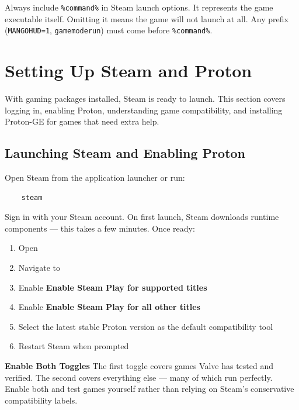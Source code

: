 \documentclass{article}
\newcommand{\code}[1]{\colorbox{codebg}{\texttt{#1}}}
\begin{document}
\begin{tcolorbox}[arc=12pt, outer arc=10pt,
	colback=red!5!white, colframe=red!60!black,
	title=\textbf{Warning}]
	Always include \code{\%command\%} in Steam launch options. It represents the
	game executable itself. Omitting it means the game will not launch at all.
	Any prefix (\code{MANGOHUD=1}, \code{gamemoderun}) must come before
	\code{\%command\%}.
\end{tcolorbox}

\newpage
\section{Setting Up Steam and Proton}

With gaming packages installed, Steam is ready to launch. This section covers
logging in, enabling Proton, understanding game compatibility, and installing
Proton-GE for games that need extra help.

\subsection{Launching Steam and Enabling Proton}

Open Steam from the application launcher or run:

\begin{verbatim}
	steam
\end{verbatim}

Sign in with your Steam account. On first launch, Steam downloads runtime
components --- this takes a few minutes. Once ready:

\begin{enumerate}[leftmargin=1.5em, nosep, label={\arabic*.}]
	\item Open 
	\item Navigate to 
	\item Enable \textbf{Enable Steam Play for supported titles}
	\item Enable \textbf{Enable Steam Play for all other titles}
	\item Select the latest stable Proton version as the default compatibility tool
	\item Restart Steam when prompted
\end{enumerate}

\begin{callout}{\textbf{Enable Both Toggles}}
	The first toggle covers games Valve has tested and verified. The second covers
	everything else --- many of which run perfectly. Enable both and test games
	yourself rather than relying on Steam's conservative compatibility labels.
\end{callout}
\end{document}
